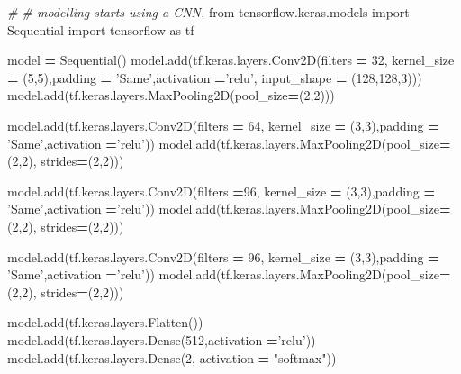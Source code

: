 \documentclass[]{book}
\newenvironment{Shaded}{\begin{snugshade}}{\end{snugshade}}
\newcommand{\CommentTok}[1]{\textcolor[rgb]{0.56,0.35,0.01}{\textit{#1}}}
\newcommand{\DecValTok}[1]{\textcolor[rgb]{0.00,0.00,0.81}{#1}}
\newcommand{\ImportTok}[1]{#1}
\newcommand{\NormalTok}[1]{#1}
\newcommand{\OperatorTok}[1]{\textcolor[rgb]{0.81,0.36,0.00}{\textbf{#1}}}
\newcommand{\StringTok}[1]{\textcolor[rgb]{0.31,0.60,0.02}{#1}}
\begin{document}
\begin{Shaded}
\begin{Highlighting}[]
\CommentTok{# # modelling starts using a CNN.}
\ImportTok{from}\NormalTok{ tensorflow.keras.models }\ImportTok{import}\NormalTok{ Sequential}
\ImportTok{import}\NormalTok{ tensorflow }\ImportTok{as}\NormalTok{ tf}

\NormalTok{model }\OperatorTok{=}\NormalTok{ Sequential()}
\NormalTok{model.add(tf.keras.layers.Conv2D(filters }\OperatorTok{=} \DecValTok{32}\NormalTok{, kernel_size }\OperatorTok{=}\NormalTok{ (}\DecValTok{5}\NormalTok{,}\DecValTok{5}\NormalTok{),padding }\OperatorTok{=} \StringTok{'Same'}\NormalTok{,activation }\OperatorTok{=}\StringTok{'relu'}\NormalTok{, input_shape }\OperatorTok{=}\NormalTok{ (}\DecValTok{128}\NormalTok{,}\DecValTok{128}\NormalTok{,}\DecValTok{3}\NormalTok{)))}
\NormalTok{model.add(tf.keras.layers.MaxPooling2D(pool_size}\OperatorTok{=}\NormalTok{(}\DecValTok{2}\NormalTok{,}\DecValTok{2}\NormalTok{)))}


\NormalTok{model.add(tf.keras.layers.Conv2D(filters }\OperatorTok{=} \DecValTok{64}\NormalTok{, kernel_size }\OperatorTok{=}\NormalTok{ (}\DecValTok{3}\NormalTok{,}\DecValTok{3}\NormalTok{),padding }\OperatorTok{=} \StringTok{'Same'}\NormalTok{,activation }\OperatorTok{=}\StringTok{'relu'}\NormalTok{))}
\NormalTok{model.add(tf.keras.layers.MaxPooling2D(pool_size}\OperatorTok{=}\NormalTok{(}\DecValTok{2}\NormalTok{,}\DecValTok{2}\NormalTok{), strides}\OperatorTok{=}\NormalTok{(}\DecValTok{2}\NormalTok{,}\DecValTok{2}\NormalTok{)))}
 

\NormalTok{model.add(tf.keras.layers.Conv2D(filters }\OperatorTok{=}\DecValTok{96}\NormalTok{, kernel_size }\OperatorTok{=}\NormalTok{ (}\DecValTok{3}\NormalTok{,}\DecValTok{3}\NormalTok{),padding }\OperatorTok{=} \StringTok{'Same'}\NormalTok{,activation }\OperatorTok{=}\StringTok{'relu'}\NormalTok{))}
\NormalTok{model.add(tf.keras.layers.MaxPooling2D(pool_size}\OperatorTok{=}\NormalTok{(}\DecValTok{2}\NormalTok{,}\DecValTok{2}\NormalTok{), strides}\OperatorTok{=}\NormalTok{(}\DecValTok{2}\NormalTok{,}\DecValTok{2}\NormalTok{)))}

\NormalTok{model.add(tf.keras.layers.Conv2D(filters }\OperatorTok{=} \DecValTok{96}\NormalTok{, kernel_size }\OperatorTok{=}\NormalTok{ (}\DecValTok{3}\NormalTok{,}\DecValTok{3}\NormalTok{),padding }\OperatorTok{=} \StringTok{'Same'}\NormalTok{,activation }\OperatorTok{=}\StringTok{'relu'}\NormalTok{))}
\NormalTok{model.add(tf.keras.layers.MaxPooling2D(pool_size}\OperatorTok{=}\NormalTok{(}\DecValTok{2}\NormalTok{,}\DecValTok{2}\NormalTok{), strides}\OperatorTok{=}\NormalTok{(}\DecValTok{2}\NormalTok{,}\DecValTok{2}\NormalTok{)))}

\NormalTok{model.add(tf.keras.layers.Flatten())}
\NormalTok{model.add(tf.keras.layers.Dense(}\DecValTok{512}\NormalTok{,activation }\OperatorTok{=}\StringTok{'relu'}\NormalTok{))}
\NormalTok{model.add(tf.keras.layers.Dense(}\DecValTok{2}\NormalTok{, activation }\OperatorTok{=} \StringTok{"softmax"}\NormalTok{))}
\end{Highlighting}
\end{Shaded}
\end{document}
